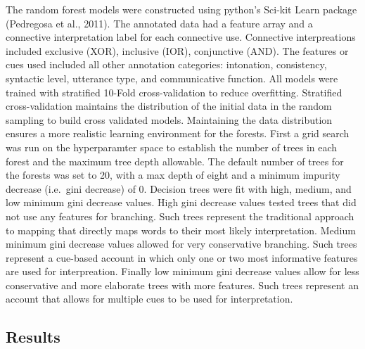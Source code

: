 \documentclass[oneside]{report}
\theoremstyle{definition}
\theoremstyle{definition}
\theoremstyle{definition}
\theoremstyle{remark}
\begin{document}
The random forest models were constructed using python's Sci-kit Learn
package (Pedregosa et al., 2011). The annotated data had a feature array
and a connective interpretation label for each connective use.
Connective interpreations included exclusive (XOR), inclusive (IOR),
conjunctive (AND). The features or cues used included all other
annotation categories: intonation, consistency, syntactic level,
utterance type, and communicative function. All models were trained with
stratified 10-Fold cross-validation to reduce overfitting. Stratified
cross-validation maintains the distribution of the initial data in the
random sampling to build cross validated models. Maintaining the data
distribution ensures a more realistic learning environment for the
forests. First a grid search was run on the hyperparamter space to
establish the number of trees in each forest and the maximum tree depth
allowable. The default number of trees for the forests was set to 20,
with a max depth of eight and a minimum impurity decrease (i.e.~gini
decrease) of 0. Decision trees were fit with high, medium, and low
minimum gini decrease values. High gini decrease values tested trees
that did not use any features for branching. Such trees represent the
traditional approach to mapping that directly maps words to their most
likely interpretation. Medium minimum gini decrease values allowed for
very conservative branching. Such trees represent a cue-based account in
which only one or two most informative features are used for
interpreation. Finally low minimum gini decrease values allow for less
conservative and more elaborate trees with more features. Such trees
represent an account that allows for multiple cues to be used for
interpretation.

\subsection{Results}\label{results-1}
\end{document}
